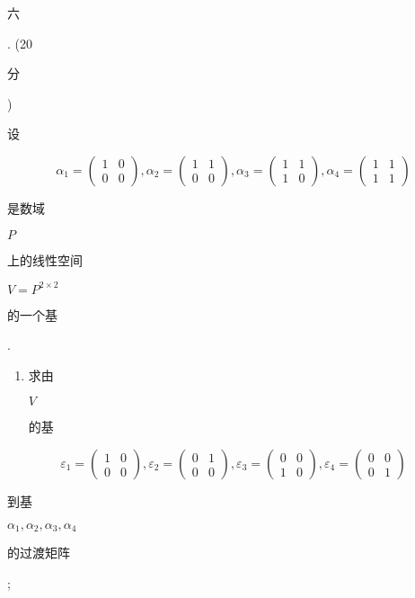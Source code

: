 \documentclass[10pt]{article}
\begin{document}
\begin{CJK}{UTF8}{mj}六\end{CJK}. (20 \begin{CJK}{UTF8}{mj}分\end{CJK}) \begin{CJK}{UTF8}{mj}设\end{CJK}
$$
\alpha_{1}=\left(\begin{array}{ll}
1 & 0 \\
0 & 0
\end{array}\right), \alpha_{2}=\left(\begin{array}{ll}
1 & 1 \\
0 & 0
\end{array}\right), \alpha_{3}=\left(\begin{array}{ll}
1 & 1 \\
1 & 0
\end{array}\right), \alpha_{4}=\left(\begin{array}{ll}
1 & 1 \\
1 & 1
\end{array}\right)
$$
\begin{CJK}{UTF8}{mj}是数域\end{CJK} $P$ \begin{CJK}{UTF8}{mj}上的线性空间\end{CJK} $V=P^{2 \times 2}$ \begin{CJK}{UTF8}{mj}的一个基\end{CJK}.

\begin{enumerate}
  \item \begin{CJK}{UTF8}{mj}求由\end{CJK} $V$ \begin{CJK}{UTF8}{mj}的基\end{CJK}
\end{enumerate}
$$
\varepsilon_{1}=\left(\begin{array}{ll}
1 & 0 \\
0 & 0
\end{array}\right), \varepsilon_{2}=\left(\begin{array}{ll}
0 & 1 \\
0 & 0
\end{array}\right), \varepsilon_{3}=\left(\begin{array}{ll}
0 & 0 \\
1 & 0
\end{array}\right), \varepsilon_{4}=\left(\begin{array}{ll}
0 & 0 \\
0 & 1
\end{array}\right)
$$
\begin{CJK}{UTF8}{mj}到基\end{CJK} $\alpha_{1}, \alpha_{2}, \alpha_{3}, \alpha_{4}$ \begin{CJK}{UTF8}{mj}的过渡矩阵\end{CJK};
\end{document}
